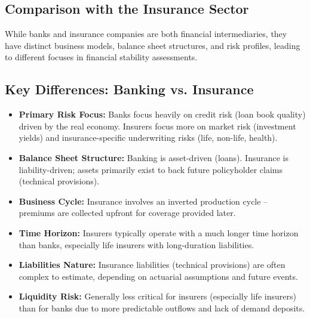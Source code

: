 \subsection{Comparison with the Insurance Sector}

While banks and insurance companies are both financial intermediaries, they have distinct business models, balance sheet structures, and risk profiles, leading to different focuses in financial stability assessments.

\subsection{Key Differences: Banking vs. Insurance}
\begin{itemize}
    \item \textbf{Primary Risk Focus:} Banks focus heavily on credit risk (loan book quality) driven by the real economy. Insurers focus more on market risk (investment yields) and insurance-specific underwriting risks (life, non-life, health).
    \item \textbf{Balance Sheet Structure:} Banking is asset-driven (loans). Insurance is liability-driven; assets primarily exist to back future policyholder claims (technical provisions).
    \item \textbf{Business Cycle:} Insurance involves an inverted production cycle – premiums are collected upfront for coverage provided later.
    \item \textbf{Time Horizon:} Insurers typically operate with a much longer time horizon than banks, especially life insurers with long-duration liabilities.
    \item \textbf{Liabilities Nature:} Insurance liabilities (technical provisions) are often complex to estimate, depending on actuarial assumptions and future events.
    \item \textbf{Liquidity Risk:} Generally less critical for insurers (especially life insurers) than for banks due to more predictable outflows and lack of demand deposits.
\end{itemize}

